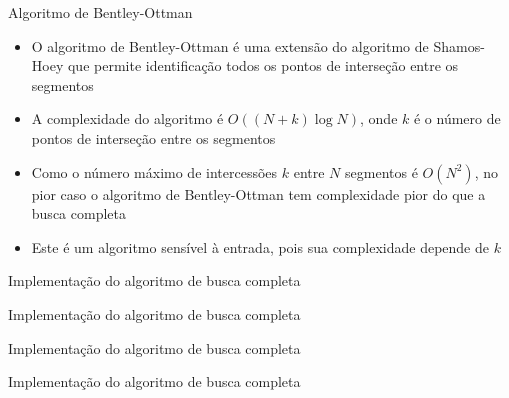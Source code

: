 \begin{frame}[fragile]{Algoritmo de Bentley-Ottman}

    \begin{itemize}
        \item O algoritmo de Bentley-Ottman é uma extensão do algoritmo de Shamos-Hoey que
            permite identificação todos os pontos de interseção entre os segmentos
        \pause

        \item A complexidade do algoritmo é $O((N + k)\log N)$, onde $k$ é o número de 
        pontos de interseção entre os segmentos
        \pause

        \item Como o número máximo de intercessões $k$ entre $N$ segmentos é $O(N^2)$,
            no pior caso o algoritmo de Bentley-Ottman tem complexidade pior do que a
            busca completa
        \pause

        \item Este é um algoritmo sensível à entrada, pois sua complexidade depende de $k$

    \end{itemize}

\end{frame}

\begin{frame}[fragile]{Implementação do algoritmo de busca completa}
\end{frame}

\begin{frame}[fragile]{Implementação do algoritmo de busca completa}
\end{frame}

\begin{frame}[fragile]{Implementação do algoritmo de busca completa}
\end{frame}

\begin{frame}[fragile]{Implementação do algoritmo de busca completa}
\end{frame}

